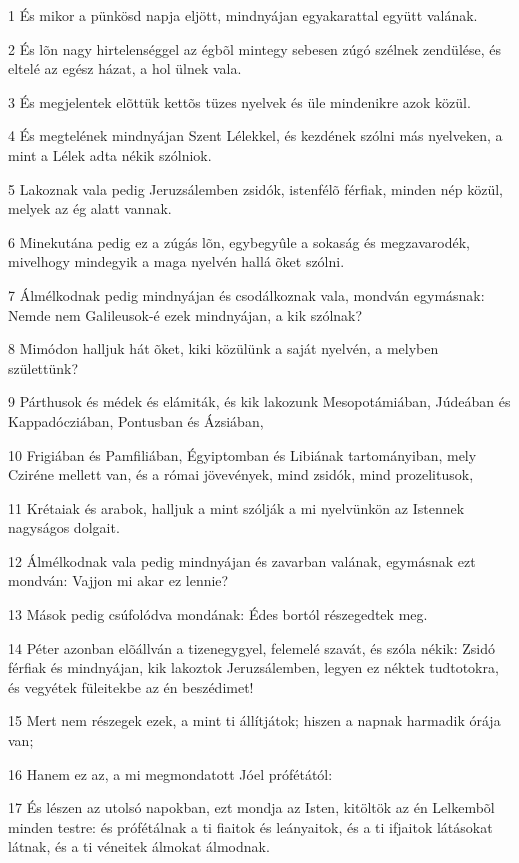\par 1 És mikor a pünkösd napja eljött, mindnyájan egyakarattal együtt valának.
\par 2 És lõn nagy hirtelenséggel az égbõl mintegy sebesen zúgó szélnek zendülése, és eltelé az egész házat, a hol ülnek vala.
\par 3 És megjelentek elõttük kettõs tüzes nyelvek és üle mindenikre azok közül.
\par 4 És megtelének mindnyájan Szent Lélekkel, és kezdének szólni más nyelveken, a mint a Lélek adta nékik szólniok.
\par 5 Lakoznak vala pedig Jeruzsálemben zsidók, istenfélõ férfiak, minden nép közül, melyek az ég alatt vannak.
\par 6 Minekutána pedig ez a zúgás lõn, egybegyûle a sokaság és megzavarodék, mivelhogy mindegyik a maga nyelvén hallá õket szólni.
\par 7 Álmélkodnak pedig mindnyájan és csodálkoznak vala, mondván egymásnak: Nemde nem Galileusok-é ezek mindnyájan, a kik szólnak?
\par 8 Mimódon halljuk hát õket, kiki közülünk a saját nyelvén, a melyben születtünk?
\par 9 Párthusok és médek és elámiták, és kik lakozunk Mesopotámiában, Júdeában és Kappadócziában, Pontusban és  Ázsiában,
\par 10 Frigiában és Pamfiliában, Égyiptomban és Libiának tartományiban, mely Cziréne mellett van, és a római jövevények, mind zsidók, mind prozelitusok,
\par 11 Krétaiak és arabok, halljuk a mint szólják a mi nyelvünkön az Istennek nagyságos dolgait.
\par 12 Álmélkodnak vala pedig mindnyájan és zavarban valának, egymásnak ezt mondván: Vajjon mi akar ez lennie?
\par 13 Mások pedig csúfolódva mondának: Édes bortól részegedtek meg.
\par 14 Péter azonban elõállván a tizenegygyel, felemelé szavát, és szóla nékik: Zsidó férfiak és mindnyájan, kik lakoztok Jeruzsálemben, legyen ez néktek tudtotokra, és vegyétek füleitekbe az én beszédimet!
\par 15 Mert nem részegek ezek, a mint ti állítjátok; hiszen a napnak harmadik órája van;
\par 16 Hanem ez az, a mi megmondatott Jóel prófétától:
\par 17 És lészen az utolsó napokban, ezt mondja az Isten, kitöltök az én Lelkembõl minden testre: és prófétálnak a ti fiaitok és leányaitok, és a ti ifjaitok látásokat látnak, és a ti véneitek álmokat álmodnak.
